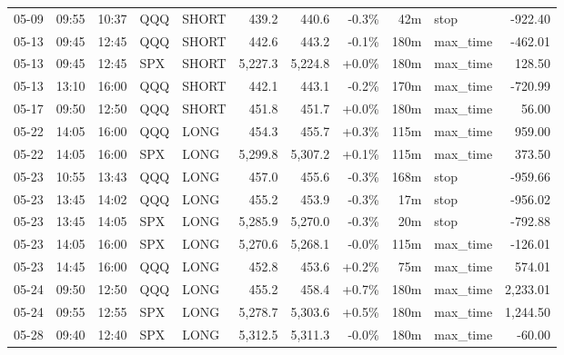 \documentclass[11pt,a4paper,twoside]{article}
\begin{document}
\begin{center}
\begin{longtable}{>{\color{txtmain}}l l l l l r r r r >{\color{txtmain}}l r}
05-09 & 09:55 & 10:37 & QQQ & SHORT & 439.2 & 440.6 & \textcolor{lossred}{-0.3\%} & 42m & stop & \textcolor{lossred}{-922.40} \\
05-13 & 09:45 & 12:45 & QQQ & SHORT & 442.6 & 443.2 & \textcolor{lossred}{-0.1\%} & 180m & max\_time & \textcolor{lossred}{-462.01} \\
05-13 & 09:45 & 12:45 & SPX & SHORT & 5,227.3 & 5,224.8 & \textcolor{wingreen}{+0.0\%} & 180m & max\_time & \textcolor{wingreen}{128.50} \\
05-13 & 13:10 & 16:00 & QQQ & SHORT & 442.1 & 443.1 & \textcolor{lossred}{-0.2\%} & 170m & max\_time & \textcolor{lossred}{-720.99} \\
05-17 & 09:50 & 12:50 & QQQ & SHORT & 451.8 & 451.7 & \textcolor{wingreen}{+0.0\%} & 180m & max\_time & \textcolor{wingreen}{56.00} \\
05-22 & 14:05 & 16:00 & QQQ & LONG & 454.3 & 455.7 & \textcolor{wingreen}{+0.3\%} & 115m & max\_time & \textcolor{wingreen}{959.00} \\
05-22 & 14:05 & 16:00 & SPX & LONG & 5,299.8 & 5,307.2 & \textcolor{wingreen}{+0.1\%} & 115m & max\_time & \textcolor{wingreen}{373.50} \\
05-23 & 10:55 & 13:43 & QQQ & LONG & 457.0 & 455.6 & \textcolor{lossred}{-0.3\%} & 168m & stop & \textcolor{lossred}{-959.66} \\
05-23 & 13:45 & 14:02 & QQQ & LONG & 455.2 & 453.9 & \textcolor{lossred}{-0.3\%} & 17m & stop & \textcolor{lossred}{-956.02} \\
05-23 & 13:45 & 14:05 & SPX & LONG & 5,285.9 & 5,270.0 & \textcolor{lossred}{-0.3\%} & 20m & stop & \textcolor{lossred}{-792.88} \\
05-23 & 14:05 & 16:00 & SPX & LONG & 5,270.6 & 5,268.1 & \textcolor{lossred}{-0.0\%} & 115m & max\_time & \textcolor{lossred}{-126.01} \\
05-23 & 14:45 & 16:00 & QQQ & LONG & 452.8 & 453.6 & \textcolor{wingreen}{+0.2\%} & 75m & max\_time & \textcolor{wingreen}{574.01} \\
05-24 & 09:50 & 12:50 & QQQ & LONG & 455.2 & 458.4 & \textcolor{wingreen}{+0.7\%} & 180m & max\_time & \textcolor{wingreen}{2,233.01} \\
05-24 & 09:55 & 12:55 & SPX & LONG & 5,278.7 & 5,303.6 & \textcolor{wingreen}{+0.5\%} & 180m & max\_time & \textcolor{wingreen}{1,244.50} \\
05-28 & 09:40 & 12:40 & SPX & LONG & 5,312.5 & 5,311.3 & \textcolor{lossred}{-0.0\%} & 180m & max\_time & \textcolor{lossred}{-60.00} \\

\end{longtable}
\end{center}
\end{document}
